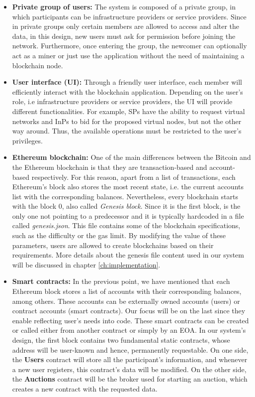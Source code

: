 \begin{itemize}
    \item \textbf{Private group of users:} The system is composed of a private group, in which participants can be infrastructure providers or service providers. Since in private groups only certain members are allowed to access and alter the data, in this design, new users must ask for permission before joining the network. Furthermore, once entering the group, the newcomer can optionally act as a miner or just use the application without the need of maintaining a blockchain node.
	\item \textbf{User interface (UI):} Through a friendly user interface,  each member will efficiently interact with the blockchain application. Depending on the user's role, i.e infrastructure providers or service providers, the UI will provide different functionalities. For example, SPs have the ability to request virtual networks and InPs to bid for the proposed virtual nodes, but not the other way around. Thus, the available operations must be restricted to the user's privileges.
	\item \textbf{Ethereum blockchain:} One of the main differences between the Bitcoin and the Ethereum blockchain is that they are transaction-based and account-based respectively. For this reason, apart from a list of transactions, each Ethereum's block also stores the most recent state, i.e. the current accounts list with the corresponding balances. Nevertheless, every blockchain starts with the block 0, also called \textit{Genesis block}. Since it is the first block, is the only one not pointing to a predecessor and it is typically hardcoded in a file called \textit{genesis.json}. This file contains some of the blockchain specifications, such as the difficulty or the gas limit. By modifying the value of these parameters, users are allowed to create blockchains based on their requirements. More details about the genesis file content used in our system will be discussed in chapter \ref{ch:implementation}.
	\item \textbf{Smart contracts:} In the previous point, we have mentioned that each Ethereum block stores a list of accounts with their corresponding balances, among others. These accounts can be externally owned accounts (users) or contract accounts (smart contracts). Our focus will be on the last since they enable reflecting user's needs into code. These smart contracts can be created or called either from another contract or simply by an EOA. In our system's design, the first block contains two fundamental static contracts, whose address will be user-known and hence, permanently requestable. On one side, the \textbf{Users} contract will store all the participant's information, and whenever a new user registers, this contract's data will be modified. On the other side, the \textbf{Auctions} contract will be the broker used for starting an auction, which creates a new contract with the requested data.

\end{itemize}

